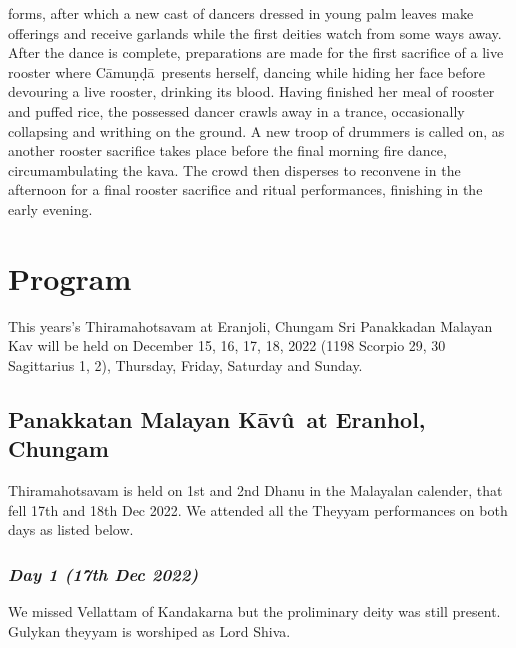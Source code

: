 \documentclass[a4paper, 11pt]{article} %
\newcommand{\camunda}[0]{C\={a}mu\d{n}\d{d}\={a}}
\newcommand{\Kavu}[0]{K\={a}v\^{u}}
\begin{document}
forms, after which a new cast of dancers dressed in young palm leaves make offerings and receive garlands while the first deities watch from some ways away.
After the dance is complete, preparations are made for the first sacrifice of a live rooster where \camunda\ presents herself, dancing while hiding her face before devouring a live rooster, drinking its blood.
Having finished her meal of rooster and puffed rice, the possessed dancer crawls away in a trance, occasionally collapsing and writhing on the ground. 
A new troop of drummers is called on, as another rooster sacrifice takes place before the final morning fire dance, circumambulating the kava.
The crowd then disperses to reconvene in the afternoon for a final rooster sacrifice and ritual performances, finishing in the early evening.


\section{Program}%
  \label{sec:Program}

This years's Thiramahotsavam at Eranjoli, Chungam Sri Panakkadan Malayan Kav will be held on December 15, 16, 17, 18, 2022 (1198 Scorpio 29, 30 Sagittarius 1, 2), Thursday, Friday, Saturday and Sunday.

\subsection{Panakkatan Malayan \Kavu\ at Eranhol, Chungam}%
  \label{sub:Panakkatan Malayan \Kavu\ at Eranhol, Chungam}
  

Thiramahotsavam is held on 1st and 2nd Dhanu in the Malayalan calender, that fell 17th and 18th Dec 2022. 
We attended all the Theyyam performances on both days as listed below.

\subsubsection*{\em Day 1 (17th Dec 2022)}%
  \label{sub:Day 1 (17th Dec 2022)}
  
We missed Vellattam of Kandakarna but the proliminary deity was still present. 
Gulykan theyyam is worshiped as Lord Shiva.
\end{document}
